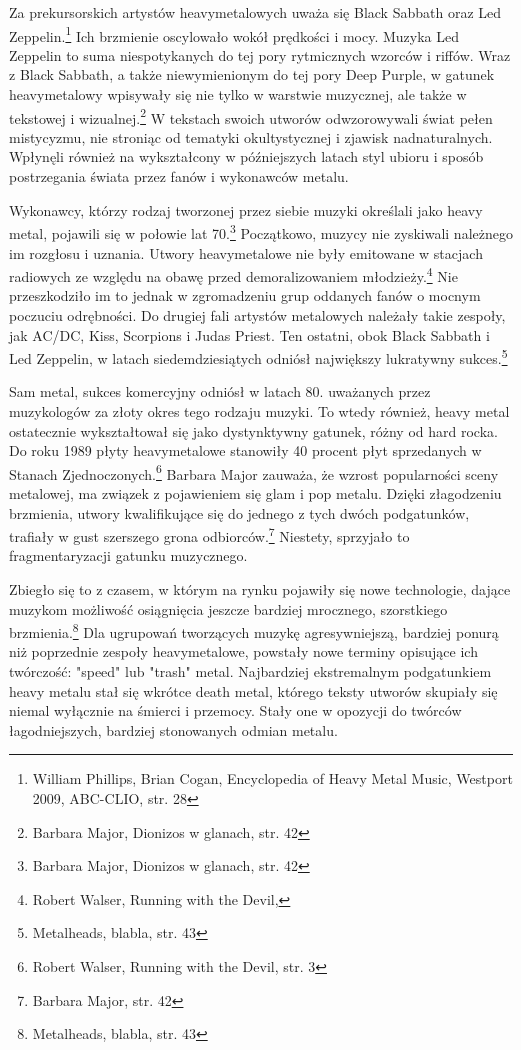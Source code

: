\documentclass[12pt, a4paper, titlepage]{report}
\begin{document}
Za prekursorskich artystów heavymetalowych uważa się Black Sabbath oraz Led Zeppelin.\footnote{William Phillips, Brian Cogan, Encyclopedia of Heavy Metal Music, Westport 2009, ABC-CLIO, str. 28} Ich brzmienie oscylowało wokół prędkości i mocy. Muzyka Led Zeppelin to suma niespotykanych do tej pory rytmicznych wzorców i riffów. Wraz z Black Sabbath, a także niewymienionym do tej pory Deep Purple, w gatunek heavymetalowy wpisywały się nie tylko w warstwie muzycznej, ale także w tekstowej i wizualnej.\footnote{Barbara Major, Dionizos w glanach, str. 42} W tekstach swoich utworów odwzorowywali świat pełen mistycyzmu, nie stroniąc od tematyki okultystycznej i zjawisk nadnaturalnych. Wpłynęli również na wykształcony w późniejszych latach styl ubioru i sposób postrzegania świata przez fanów i wykonawców metalu. 

Wykonawcy, którzy rodzaj tworzonej przez siebie muzyki określali jako heavy metal, pojawili się w połowie lat 70.\footnote{Barbara Major, Dionizos w glanach, str. 42} Początkowo, muzycy nie zyskiwali należnego im rozgłosu i uznania. Utwory heavymetalowe nie były emitowane w stacjach radiowych ze względu na obawę przed demoralizowaniem młodzieży.\footnote{Robert Walser, Running with the Devil, } Nie przeszkodziło im to jednak w zgromadzeniu grup oddanych fanów o mocnym poczuciu odrębności. Do drugiej fali artystów metalowych należały takie zespoły, jak AC/DC, Kiss, Scorpions i Judas Priest. Ten ostatni, obok Black Sabbath i Led Zeppelin, w latach siedemdziesiątych odniósł największy lukratywny sukces.\footnote{Metalheads, blabla, str. 43}

Sam metal, sukces komercyjny odniósł w latach 80. uważanych przez muzykologów za złoty okres tego rodzaju muzyki. To wtedy również, heavy metal ostatecznie wykształtował się jako dystynktywny gatunek, różny od hard rocka. Do roku 1989 płyty heavymetalowe stanowiły 40 procent płyt sprzedanych w Stanach Zjednoczonych.\footnote{Robert Walser, Running with the Devil, str. 3} Barbara Major zauważa, że wzrost popularności sceny metalowej, ma związek z pojawieniem się glam i pop metalu. Dzięki złagodzeniu brzmienia, utwory kwalifikujące się do jednego z tych dwóch podgatunków, trafiały w gust szerszego grona odbiorców.\footnote{Barbara Major, str. 42} Niestety, sprzyjało to fragmentaryzacji gatunku muzycznego. 

Zbiegło się to z czasem, w którym na rynku pojawiły się nowe technologie, dające muzykom możliwość osiągnięcia jeszcze bardziej mrocznego, szorstkiego brzmienia.\footnote{Metalheads, blabla, str. 43} Dla ugrupowań tworzących muzykę agresywniejszą, bardziej ponurą niż poprzednie zespoły heavymetalowe, powstały nowe terminy opisujące ich twórczość: "speed" lub "trash" metal. Najbardziej ekstremalnym podgatunkiem heavy metalu stał się wkrótce death metal, którego teksty utworów skupiały się niemal wyłącznie na śmierci i przemocy. Stały one w opozycji do twórców łagodniejszych, bardziej stonowanych odmian metalu. 
\end{document}
